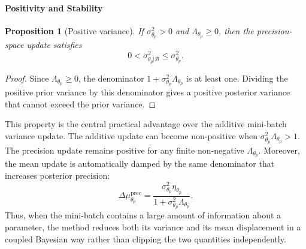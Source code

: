 \documentclass[11pt]{article}
\newtheorem{proposition}{Proposition}
\begin{document}
\paragraph{Positivity and Stability}
\begin{proposition}[Positive variance]
If
\(
\sigma^2_{\theta_p}>0
\)
and
\(
\Lambda_{\theta_p}\geq 0
\),
then the precision-space update satisfies
\begin{equation}
    0
    <
    \sigma^2_{\theta_p|\mathcal{B}}
    \leq
    \sigma^2_{\theta_p}.
    \label{eq:positive-monotone-var}
\end{equation}
\end{proposition}

\begin{proof}
Since
\(
\Lambda_{\theta_p}\geq 0
\),
the denominator
\(
1+\sigma^2_{\theta_p}\Lambda_{\theta_p}
\)
is at least one. Dividing the positive prior variance by this denominator
gives a positive posterior variance that cannot exceed the prior variance.
\end{proof}

This property is the central practical advantage over the additive mini-batch
variance update. The additive update can become non-positive when
\(
\sigma^2_{\theta_p}\Lambda_{\theta_p}>1
\).
The precision update remains positive for any finite non-negative
\(
\Lambda_{\theta_p}
\).
Moreover, the mean update is automatically damped by the same denominator
that increases posterior precision:
\begin{equation}
    \Delta \mu_{\theta_p}^{\mathrm{prec}}
    =
    \frac{
    \sigma^2_{\theta_p}\eta_{\theta_p}
    }{
    1+\sigma^2_{\theta_p}\Lambda_{\theta_p}
    }.
    \label{eq:self-normalized-mean}
\end{equation}
Thus, when the mini-batch contains a large amount of information about a
parameter, the method reduces both its variance and its mean displacement in
a coupled Bayesian way rather than clipping the two quantities independently.
\end{document}
